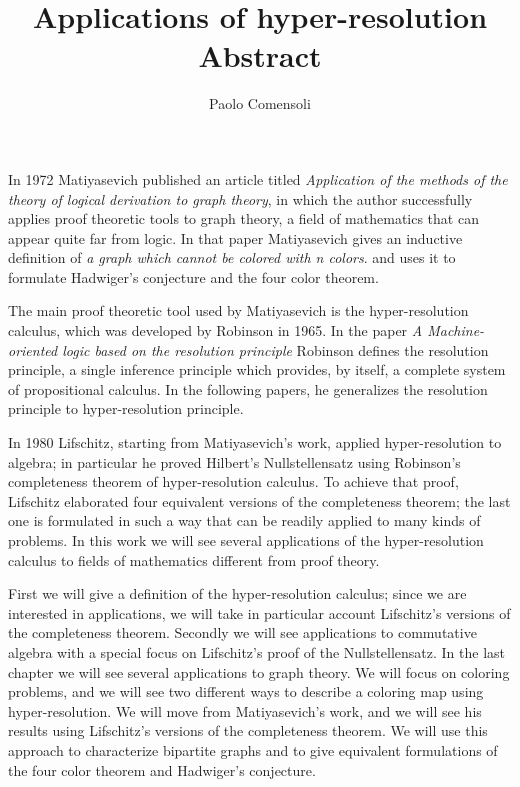 \documentclass[a4paper,12pt]{article}
\title{Applications of hyper-resolution\\{\small Abstract}}
\author{Paolo Comensoli}
\date{}
\begin{document}
 
\maketitle

\thispagestyle{empty}

In 1972 Matiyasevich published an article titled \textit{Application of the methods of the theory of logical derivation to graph theory}, in which the author successfully applies proof theoretic tools to graph theory, a field of mathematics that can appear quite far from logic. In that paper Matiyasevich gives an inductive definition of \textit{a graph which cannot be colored with n colors}. and uses it to formulate Hadwiger's conjecture and the four color theorem. 

The main proof theoretic tool used by Matiyasevich is the hyper-resolution calculus, which was developed by Robinson in 1965. In the paper \textit{A Machine-oriented logic based on the resolution principle} Robinson defines the resolution principle, a single inference principle which provides, by itself, a complete system of propositional calculus. In the following papers, he generalizes the resolution principle to hyper-resolution principle. 

In 1980 Lifschitz, starting from Matiyasevich's work, applied hyper-resolution to algebra; in particular he proved Hilbert's Nullstellensatz using Robinson's completeness theorem of hyper-resolution calculus. To achieve that proof, Lifschitz elaborated four equivalent versions of the completeness theorem; the last one is formulated in such a way that can be readily applied to many kinds of problems. In this work we will see several applications of the hyper-resolution calculus to fields of mathematics different from proof theory. 

First we will give a definition of the hyper-resolution calculus; since we are interested in applications, we will take in particular account Lifschitz's versions of the completeness theorem.
Secondly we will see applications to commutative algebra with a special focus on  Lifschitz's proof of the  Nullstellensatz. In the last chapter we will see several applications to graph theory. We will focus on coloring problems, and we will see two different ways to describe a coloring map using hyper-resolution. We will move from Matiyasevich's work,  and we will see his results using Lifschitz's versions of the completeness theorem. We will use this approach to characterize bipartite graphs and to give equivalent formulations of the four color theorem and  Hadwiger's conjecture.
\end{document}
